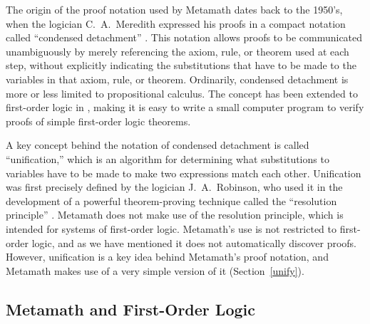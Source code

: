 The origin of the proof notation used by Metamath dates back to the 1950's,
when the logician C.~A.~Meredith expressed his proofs in a compact notation
called ``condensed detachment''
\cite{Hindley} \cite{Kalman}
\cite{Meredith} \cite{Peterson}.  This notation allows proofs to be communicated unambiguously by
merely referencing the axiom, rule, or
theorem used at each step, without explicitly indicating the
substitutions that
have to be made to the variables in that axiom, rule, or theorem.  Ordinarily,
condensed detachment is more or less limited to propositional
calculus.  The concept has been extended to
first-order logic in \cite{Megill}, making it is easy to write a small computer program to verify proofs
of simple first-order logic theorems.

A key concept behind the notation of condensed detachment is called
``unification,'' which is an algorithm for determining what
substitutions to
variables have to be made to make two expressions match each other.
Unification was first precisely defined by the logician J.~A.~Robinson, who
used it in the development of a powerful
theorem-proving technique called the ``resolution principle''
\cite{Robinson}. Metamath does not make
use of the resolution principle, which is intended for systems of first-order
logic.  Metamath's use is not restricted to
first-order logic, and as we have mentioned it does not automatically discover
proofs.  However, unification is a key idea behind Metamath's proof
notation, and Metamath makes use of a very simple version of it
(Section~\ref{unify}).

\subsection{Metamath and First-Order Logic}

